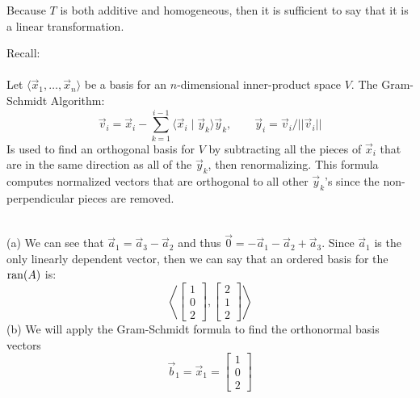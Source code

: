\documentclass{report}
\begin{document}
Because $T$ is both additive and homogeneous, then it is sufficient to say that it is a linear transformation.
\pagebreak
{}
\begin{note}
Recall: \\
\\
\noindent Let $\langle \vec{x}_1, \ldots, \vec{x}_n \rangle$ be a basis for an $n$-dimensional inner-product space $V$. The Gram-Schmidt Algorithm:
$$
\vec{v}_i = \vec{x}_i - \sum_{k=1}^{i-1} \langle \vec{x}_{i} \mid \vec{y}_k \rangle \vec{y}_k, \qquad \vec{y}_i = \vec{v}_i/||\vec{v}_i||
$$
Is used to find an orthogonal basis for $V$ by subtracting all the pieces of $\vec{x}_i$ that are in the same direction as all of the $\vec{y}_k$, then renormalizing. This formula computes normalized vectors that are orthogonal to all other $\vec{y}_k$'s since the non-perpendicular pieces are removed.
\end{note}
\sol \\
(a) We can see that $\vec{a}_1 = \vec{a}_3 - \vec{a}_2$ and thus $\vec{0} = -\vec{a}_1 - \vec{a}_2 + \vec{a}_3$. Since $\vec{a}_1$ is the only linearly dependent vector, then we can say that an ordered basis for the $\operatorname{ran}(A)$ is:
$$
\left\langle 
\begin{bmatrix}1\\0\\2\end{bmatrix},
\begin{bmatrix}2\\1\\2\end{bmatrix}
\right\rangle
$$
(b) We will apply the Gram-Schmidt formula to find the orthonormal basis vectors
$$
\vec{b}_1 = \vec{x}_1 = \begin{bmatrix}1\\0\\2\end{bmatrix}
$$
\end{document}
